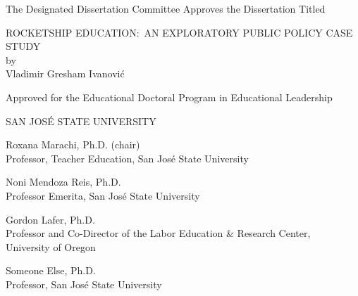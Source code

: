 
\begin{vplace}%
\OnehalfSpacing\raggedright%

\begin{center}
The Designated Dissertation Committee Approves the Dissertation Titled\\
\vspace{2\baselineskip}

ROCKETSHIP EDUCATION:~AN EXPLORATORY PUBLIC POLICY CASE STUDY\\
by\\
Vladimir Gresham Ivanović\\
\vspace{2\baselineskip}

Approved for the Educational Doctoral Program in Educational Leadership\\
\vspace{2\baselineskip}

SAN JOSÉ STATE UNIVERSITY\\
\end{center}
\vspace{\baselineskip}

Roxana Marachi, Ph.D. (chair)\hrulefill\\%
Professor, Teacher Education, San José State University\\
\vspace{\baselineskip}

Noni Mendoza Reis, Ph.D.\hrulefill\\%
Professor Emerita, San José State University\\
\vspace{\baselineskip}

Gordon Lafer, Ph.D.\hrulefill\\%
Professor and Co-Director of the Labor Education \& Research Center,\\
University of Oregon
\vspace{\baselineskip}

Someone Else, Ph.D.\hrulefill\\%
Professor, San José State University

\end{vplace}

\thispagestyle{empty}

